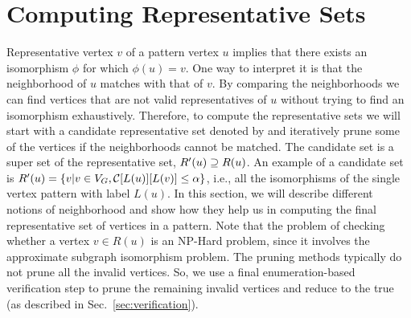 
\section{Computing Representative Sets} 
\label{sec:representative}

Representative vertex $v$ of a pattern vertex $u$ implies that there
exists an isomorphism $\phi$ for which $\phi(u) = v$.  One way to
interpret it is that the neighborhood of $u$ matches with that of $v$.
By comparing the neighborhoods we can find vertices that are not valid
representatives of $u$ without trying to find an isomorphism
exhaustively.  Therefore, to compute the representative sets we will
start with a candidate representative set denoted by \CR  and
iteratively prune some of the vertices if the neighborhoods cannot be
matched.  The candidate set is a super set of the representative set,
$R'(u) \supseteq R(u)$.  An example of a candidate set is $R'(u) = \{v| v \in
V_G, {\mathcal{C}}[L(u)][L(v)] \leq \alpha \}$, i.e., all the isomorphisms
of the single vertex pattern with label $L(u)$.  In this section, we
will describe different notions of neighborhood and show how they help
us in computing the final representative set of vertices in a pattern.
Note that the problem of checking whether a vertex $v \in R(u)$ is an
NP-Hard problem, since it involves the approximate subgraph isomorphism
problem. The pruning methods typically do not prune all the invalid
vertices.  So, we use a final enumeration-based verification step to
prune the remaining invalid vertices and reduce \CR to the true \RS (as
described in Sec.~\ref{sec:verification}).

